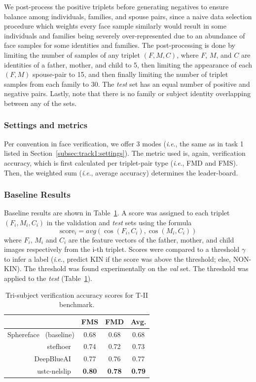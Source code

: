 \documentclass[letterpaper, 10 pt, conference]{ieeeconf}
\newcommand{\ie}{\textit{i}.\textit{e}., }
\begin{document}
We post-process the positive triplets before generating negatives to ensure balance among individuals, families, and spouse pairs, since a naive data selection procedure which weights every face sample similarly would result in some individuals and families being severely over-represented due to an abundance of face samples for some identities and families. 
The post-processing is done by limiting the number of samples of any triplet $(F, M, C)$, where $F$, $M$, and $C$ are identities of a father, mother, and child to 5, then limiting the appearance of each $(F, M)$ spouse-pair to 15, and then finally limiting the number of triplet samples from each family to 30. The \emph{test} set has an equal number of positive and negative pairs. Lastly, note that there is no family or subject identity overlapping between any of the sets.
%


\subsubsection{Settings and metrics}
Per convention in face verification, we offer 3 modes (\ie the same as in task 1 listed in Section~\ref{subsec:track1:settings}). The metric used is, again, verification accuracy, which is first calculated per triplet-pair type (\ie FMD and FMS). Then, the weighted sum (\ie average accuracy) determines the leader-board.



\subsubsection{Baseline Results}
Baseline results are shown in Table~\ref{tab:benchmark:track2}. A score was assigned to each triplet $(F_i, M_i, C_i)$ in the validation and \emph{test} sets using the formula $$ \text{score}_{i} =  avg(\cos{(F_i, C_i)}, \cos{(M_i, C_i)}) $$
where $F_i$, $M_i$ and $C_i$ are the feature vectors of the father, mother, and child images respectively from the i-th triplet. 
Scores were compared to a threshold $\gamma$ to infer a label (\ie predict KIN if the score was above the threshold; else, NON-KIN). 
The threshold was found experimentally on the \emph{val} set. The threshold was applied to the \emph{test} (Table~\ref{tab:benchmark:track2}).

\begin{table}[b]
\scriptsize
\centering
\caption {Tri-subject verification accuracy scores for T-II benchmark.}
\label{tab:benchmark:track2}
\begin{tabular}{r|cc|c}
  &FMS & FMD & Avg. \\
  \midrule
  
  Sphereface~\cite{Liu_2017_CVPR} (baseline) & 0.68 & 0.68 & 0.68 \\ 
    stefhoer~\cite{id2} & 0.74 & 0.72 & 0.73 \\
  DeepBlueAI~\cite{id3}  & 0.77 & 0.76 & 0.77 \\
 ustc-nelslip~\cite{id6}  & \textbf{0.80} & \textbf{0.78} & \textbf{0.79} \\
\end{tabular}
\end{table}
\end{document}
